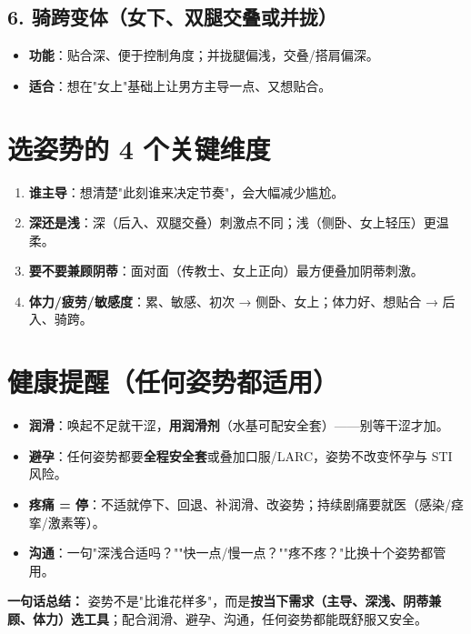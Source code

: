 \subsection*{6. 骑跨变体（女下、双腿交叠或并拢）}
\begin{itemize}[leftmargin=2em,itemsep=0.3em]
  \item \textbf{功能}：贴合深、便于控制角度；并拢腿偏浅，交叠/搭肩偏深。
  \item \textbf{适合}：想在"女上"基础上让男方主导一点、又想贴合。
\end{itemize}

\section{选姿势的 4 个关键维度}

\begin{enumerate}[leftmargin=2em,itemsep=0.3em]
  \item \textbf{谁主导}：想清楚"此刻谁来决定节奏"，会大幅减少尴尬。
  \item \textbf{深还是浅}：深（后入、双腿交叠）刺激点不同；浅（侧卧、女上轻压）更温柔。
  \item \textbf{要不要兼顾阴蒂}：面对面（传教士、女上正向）最方便叠加阴蒂刺激。
  \item \textbf{体力/疲劳/敏感度}：累、敏感、初次 → 侧卧、女上；体力好、想贴合 → 后入、骑跨。
\end{enumerate}

\section{健康提醒（任何姿势都适用）}

\begin{itemize}[leftmargin=2em,itemsep=0.3em]
  \item \textbf{润滑}：唤起不足就干涩，\textbf{用润滑剂}（水基可配安全套）——别等干涩才加。
  \item \textbf{避孕}：任何姿势都要\textbf{全程安全套}或叠加口服/LARC，姿势不改变怀孕与 STI 风险。
  \item \textbf{疼痛 = 停}：不适就停下、回退、补润滑、改姿势；持续剧痛要就医（感染/痉挛/激素等）。
  \item \textbf{沟通}：一句"深浅合适吗？""快一点/慢一点？""疼不疼？"比换十个姿势都管用。
\end{itemize}

\vspace{1em}
\noindent\textbf{一句话总结：} 姿势不是"比谁花样多"，而是\textbf{按当下需求（主导、深浅、阴蒂兼顾、体力）选工具}；配合润滑、避孕、沟通，任何姿势都能既舒服又安全。


